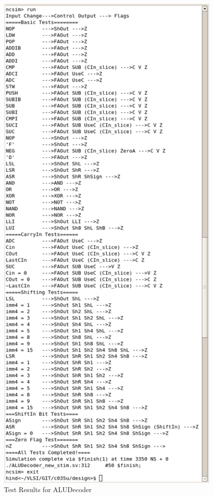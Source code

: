 \begin{figure}[h]
	\centering
	\includegraphics[scale=0.56]{results/ALUDecoder.png}
	\caption{Test Results for ALUDecoder}
	\label{fig:ALUDecoderRes}
\end{figure}

